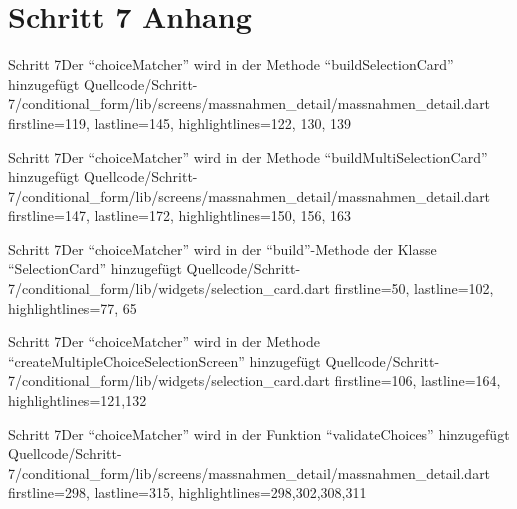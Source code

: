 \chapter{Schritt 7 Anhang}
\label{appendix:Schritt7Anhang}


\begin{alexlisting}{Schritt 7}{Der \enquote{choiceMatcher} wird in der Methode \enquote{buildSelectionCard} hinzugefügt}
    {Quellcode/Schritt-7/conditional_form/lib/screens/massnahmen_detail/massnahmen_detail.dart}
    {firstline=119, lastline=145, highlightlines={122, 130, 139}}
    \label{lst:Schritt7AppendixbuildSelectionCard}
\end{alexlisting}


\begin{alexlisting}{Schritt 7}{Der \enquote{choiceMatcher} wird in der Methode \enquote{buildMultiSelectionCard} hinzugefügt}
    {Quellcode/Schritt-7/conditional_form/lib/screens/massnahmen_detail/massnahmen_detail.dart}
    {firstline=147, lastline=172, highlightlines={150, 156, 163}}
    \label{lst:Schritt7buildMultiSelectionCard}
\end{alexlisting}


\begin{alexlisting}{Schritt 7}{Der \enquote{choiceMatcher} wird in der \enquote{build}-Methode der Klasse \enquote{SelectionCard} hinzugefügt}
    {Quellcode/Schritt-7/conditional_form/lib/widgets/selection_card.dart}
    {firstline=50, lastline=102, highlightlines={77, 65}}
    \label{lst:Schritt7validityChangedStreamBuilderChoiceMatcher}
\end{alexlisting}



\begin{alexlisting}{Schritt 7}{Der \enquote{choiceMatcher} wird in der Methode \enquote{createMultipleChoiceSelectionScreen} hinzugefügt}
    {Quellcode/Schritt-7/conditional_form/lib/widgets/selection_card.dart}
    {firstline=106, lastline=164, highlightlines={121,132}}
    \label{lst:Schritt7createMultipleChoiceSelectionScreenChoiceMatcher}
\end{alexlisting}

\begin{alexlisting}{Schritt 7}{Der \enquote{choiceMatcher} wird in der Funktion \enquote{validateChoices} hinzugefügt}
    {Quellcode/Schritt-7/conditional_form/lib/screens/massnahmen_detail/massnahmen_detail.dart}
    {firstline=298, lastline=315, highlightlines={298,302,308,311}}
    \label{lst:Schritt7validateChoices}
\end{alexlisting}